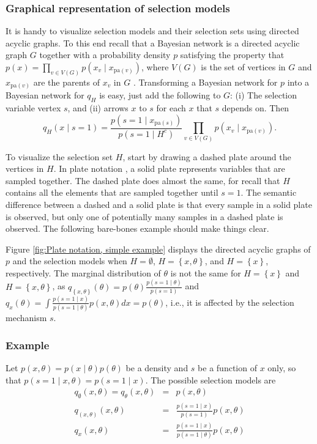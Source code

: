 \documentclass[english]{article}
\begin{document}
\subsubsection*{Graphical representation of selection models}

It is handy to visualize selection models and their selection sets using directed acyclic graphs. To this end recall that a Bayesian network is a directed acyclic graph $G$ together with a probability density $p$ satisfying the property that $p(x)=\prod_{v\in V(G)}p(x_{v}\mid x_{\textrm{pa}(v)})$, where $V(G)$ is the set of vertices in $G$ and $x_{\textrm{pa}(v)}$ are the parents of $x_{v}$ in $G$ \citep{Pearl2014}. Transforming a Bayesian network for $p$ into a Bayesian network for $q_{H}$ is easy, just add the following to $G$: (i) The selection variable vertex $s$, and (ii) arrows $x$ to $s$ for each $x$ that $s$ depends on. Then
\begin{equation}
q_{H}(x\mid s=1)=\frac{p(s=1\mid x_{\textrm{pa}(s)})}{p(s=1\mid H^{c})}\prod_{v\in V(G)}p(x_{v}\mid x_{\textrm{pa}(v)})\label{eq:DAG, selection model}.
\end{equation}

To visualize the selection set $H$, start by drawing a dashed plate around the vertices in $H$. In plate notation \citep{buntine1994operations}, a solid plate represents variables that are sampled together. The dashed plate does almost the same, for recall that $H$ contains all the elements that are sampled together until $s=1$. The semantic difference between a dashed and a solid plate is that every sample in a solid plate is observed, but only one of potentially many samples in a dashed plate is observed. The following bare-bones example should make things clear.

Figure \ref{fig:Plate notation, simple example} displays the directed acyclic graphs of $p$ and the selection models when $H = \emptyset$, $H=\left\{ x,\theta\right\}$, and $H=\left\{ x\right\}$, respectively. The marginal distribution of $\theta$ is not the same for $H=\left\{ x\right\}$ and $H=\left\{ x,\theta\right\} $, as $q_{\left\{ x,\theta\right\} }(\theta) = p(\theta)\frac{p(s=1\mid\theta)}{p(s=1)}$ and $q_{x}(\theta) = \int\frac{p(s=1\mid x)}{p(s=1\mid\theta)}p(x,\theta)dx=p(\theta)$, i.e., it is affected by the selection mechanism $s$.

\subsubsection*{Example}\label{exa:Marginal density of theta}
Let $p(x,\theta)=p(x\mid\theta)p(\theta)$ be a density and $s$ be a function of $x$ only, so that $p(s=1\mid x,\theta)=p(s=1\mid x)$.
The possible selection models are
\begin{eqnarray*}
q_{\emptyset}(x,\theta) = q_{\theta}(x,\theta) & = & p(x,\theta)\\
q_{(x,\theta)}(x,\theta) & = & \frac{p(s=1\mid x)}{p(s=1)}p(x,\theta)\\
q_{x}(x,\theta) & = & \frac{p(s=1\mid x)}{p(s=1\mid\theta)}p(x,\theta)
\end{eqnarray*}
\end{document}
